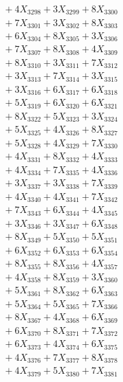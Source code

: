 \documentclass[a4paper,10pt]{article}
\begin{document}
{\begin{align}
&\;  + 4 X_{3298} + 3 X_{3299} + 8 X_{3300} \\[0.3ex]
&\;  + 7 X_{3301} + 3 X_{3302} + 8 X_{3303} \\[0.3ex]
&\;  + 6 X_{3304} + 8 X_{3305} + 3 X_{3306} \\[0.3ex]
&\;  + 7 X_{3307} + 8 X_{3308} + 4 X_{3309} \\[0.5ex]\allowbreak
&\;  + 8 X_{3310} + 3 X_{3311} + 7 X_{3312} \\[0.3ex]
&\;  + 3 X_{3313} + 7 X_{3314} + 3 X_{3315} \\[0.3ex]
&\;  + 3 X_{3316} + 6 X_{3317} + 6 X_{3318} \\[0.3ex]
&\;  + 5 X_{3319} + 6 X_{3320} + 6 X_{3321} \\[0.3ex]
&\;  + 8 X_{3322} + 5 X_{3323} + 3 X_{3324} \\[0.3ex]
&\;  + 5 X_{3325} + 4 X_{3326} + 8 X_{3327} \\[0.3ex]
&\;  + 5 X_{3328} + 4 X_{3329} + 7 X_{3330} \\[0.3ex]
&\;  + 4 X_{3331} + 8 X_{3332} + 4 X_{3333} \\[0.3ex]
&\;  + 4 X_{3334} + 7 X_{3335} + 4 X_{3336} \\[0.3ex]
&\;  + 3 X_{3337} + 3 X_{3338} + 7 X_{3339} \\[0.5ex]\allowbreak
&\;  + 4 X_{3340} + 4 X_{3341} + 7 X_{3342} \\[0.3ex]
&\;  + 7 X_{3343} + 6 X_{3344} + 4 X_{3345} \\[0.3ex]
&\;  + 3 X_{3346} + 3 X_{3347} + 6 X_{3348} \\[0.3ex]
&\;  + 8 X_{3349} + 5 X_{3350} + 5 X_{3351} \\[0.3ex]
&\;  + 6 X_{3352} + 6 X_{3353} + 6 X_{3354} \\[0.3ex]
&\;  + 8 X_{3355} + 8 X_{3356} + 4 X_{3357} \\[0.3ex]
&\;  + 4 X_{3358} + 8 X_{3359} + 3 X_{3360} \\[0.3ex]
&\;  + 5 X_{3361} + 8 X_{3362} + 6 X_{3363} \\[0.3ex]
&\;  + 5 X_{3364} + 5 X_{3365} + 7 X_{3366} \\[0.3ex]
&\;  + 8 X_{3367} + 4 X_{3368} + 6 X_{3369} \\[0.5ex]\allowbreak
&\;  + 6 X_{3370} + 8 X_{3371} + 7 X_{3372} \\[0.3ex]
&\;  + 6 X_{3373} + 4 X_{3374} + 6 X_{3375} \\[0.3ex]
&\;  + 4 X_{3376} + 7 X_{3377} + 8 X_{3378} \\[0.3ex]
&\;  + 4 X_{3379} + 5 X_{3380} + 7 X_{3381} \\[0.3ex]

\end{align}}
\end{document}
